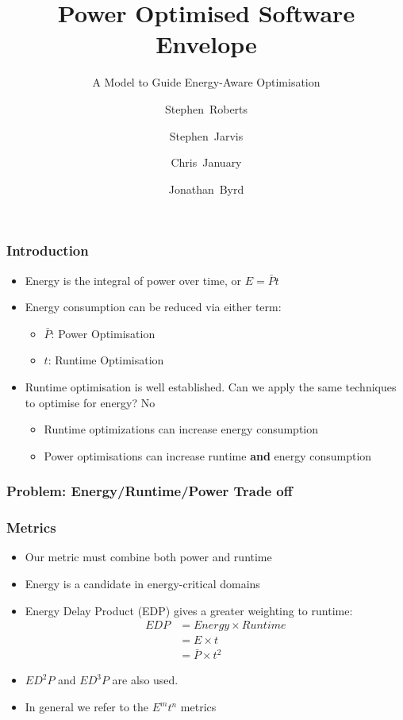 \documentclass{beamer}
\title[POSE] %
{Power Optimised Software Envelope}
\subtitle{A Model to Guide Energy-Aware Optimisation}
\author[Roberts et al.] %
{Stephen~Roberts\inst{1} \and Stephen~Jarvis\inst{1} \\
 \and Chris~January\inst{1} \and Jonathan~Byrd\inst{2}}
\institute[University of Warwick] %
{
    \inst{1}%
      Department of Computer Science\\
      The University of Warwick
    \and
      \inst{2}%
        Allinea Software
}
\begin{document}
  \frame{\titlepage}
  \begin{frame}
    \frametitle{Introduction}
    \begin{itemize}
      \item Energy is the integral of power over time, or $E = \bar{P}t$
      \item Energy consumption can be reduced via either term:
      \begin{itemize}
        \item $\bar{P}$: Power Optimisation
        \item $t$: Runtime Optimisation
      \end{itemize}
      \item Runtime optimisation is well established. Can we apply the same techniques to optimise for energy? No
       \begin{itemize}
        \item Runtime optimizations can increase energy consumption
        \item Power optimisations can increase runtime \textbf{and} energy consumption
      \end{itemize}
    \end{itemize}
  \end{frame}
  
  \begin{frame}
    \frametitle{Problem: Energy/Runtime/Power Trade off}
    \begin{figure}
    \centering
    
    \end{figure}
  \end{frame}

  \begin{frame}
  \frametitle{Metrics}
  \begin{itemize}
  \item Our metric must combine both power and runtime
  \item Energy is a candidate in energy-critical domains
  \item Energy Delay Product (EDP) gives a greater weighting to runtime:
  \begin{align}
    EDP &= Energy \times Runtime \nonumber \\
        &= E \times t \nonumber \\
        &= \bar{P} \times t^2
  \end{align}
  \item $ED^2P$ and $ED^3P$ are also used.
  \item In general we refer to the $E^mt^n$ metrics 
  \end{itemize}
  \end{frame}
\end{document}

